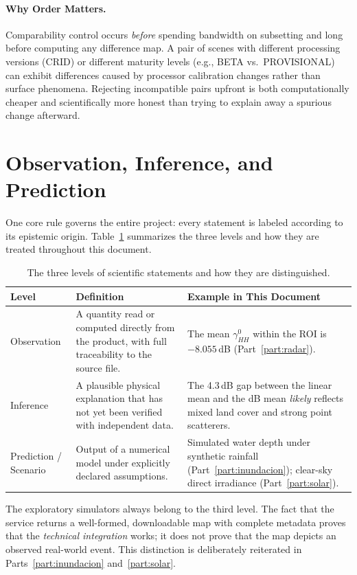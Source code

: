\documentclass[11pt,a4paper]{article}
\begin{document}
\paragraph{Why Order Matters.} Comparability control occurs \emph{before} spending bandwidth on subsetting and long before computing any difference map. A pair of scenes with different processing versions (CRID) or different maturity levels (e.g., BETA vs.\ PROVISIONAL) can exhibit differences caused by processor calibration changes rather than surface phenomena. Rejecting incompatible pairs upfront is both computationally cheaper and scientifically more honest than trying to explain away a spurious change afterward.

\section{Observation, Inference, and Prediction}
\label{sec:tres-niveles}

One core rule governs the entire project: every statement is labeled according to its epistemic origin. Table~\ref{tab:niveles} summarizes the three levels and how they are treated throughout this document.

\begin{table}[htbp]
\centering\small
\begin{tabularx}{\linewidth}{p{.17\linewidth}p{.36\linewidth}X}
\toprule
\textbf{Level} & \textbf{Definition} & \textbf{Example in This Document}\\\midrule
Observation & A quantity read or computed directly from the product, with full traceability to the source file. &
The mean $\gamma^0_{HH}$ within the ROI is $-8.055$\,dB (Part~\ref{part:radar}).\\
Inference & A plausible physical explanation that has not yet been verified with independent data. &
The 4.3\,dB gap between the linear mean and the dB mean \emph{likely} reflects mixed land cover and strong point scatterers.\\
Prediction / Scenario & Output of a numerical model under explicitly declared assumptions. &
Simulated water depth under synthetic rainfall (Part~\ref{part:inundacion}); clear-sky direct irradiance (Part~\ref{part:solar}).\\\bottomrule
\end{tabularx}
\caption{The three levels of scientific statements and how they are distinguished.}
\label{tab:niveles}
\end{table}

The exploratory simulators always belong to the third level. The fact that the service returns a well-formed, downloadable map with complete metadata proves that the \emph{technical integration} works; it does not prove that the map depicts an observed real-world event. This distinction is deliberately reiterated in Parts~\ref{part:inundacion} and~\ref{part:solar}.
\end{document}
